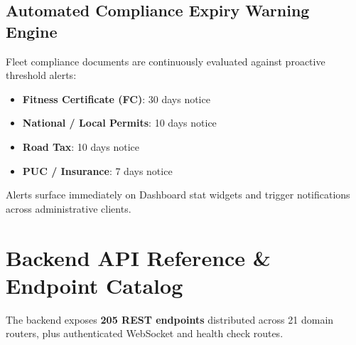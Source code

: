 \documentclass[11pt,a4paper]{article}
\begin{document}
\subsection{Automated Compliance Expiry Warning Engine}
Fleet compliance documents are continuously evaluated against proactive threshold alerts:
\begin{itemize}[leftmargin=1.2em,itemsep=2pt]
  \item \textbf{Fitness Certificate (FC)}: 30 days notice
  \item \textbf{National / Local Permits}: 10 days notice
  \item \textbf{Road Tax}: 10 days notice
  \item \textbf{PUC / Insurance}: 7 days notice
\end{itemize}
Alerts surface immediately on Dashboard stat widgets and trigger notifications across administrative clients.

\section{Backend API Reference \& Endpoint Catalog}

The backend exposes \textbf{205 REST endpoints} distributed across 21 domain routers, plus authenticated WebSocket and health check routes.
\end{document}
